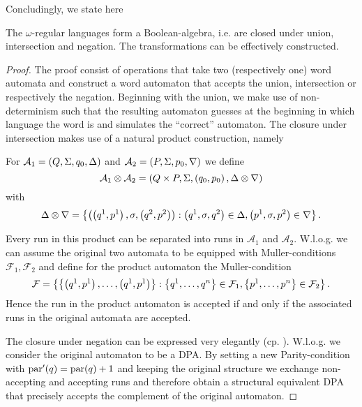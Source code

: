 Concludingly, we state here
\begin{theorem}
  \cite[Consequence from Theorem 1.5 and Theorem 1.24]{AutoLogAndInfGames}
  The $\omega$-regular languages form a Boolean-algebra, i.e. are closed under
  union, intersection and negation. The transformations can be effectively
  constructed.
  \label{thm:omegaregboolean}
\end{theorem}
\begin{proof}
  The proof consist of operations that take two (respectively one) word 
  automata and construct a word automaton that accepts the union, intersection 
  or respectively the negation. Beginning with the union, we make use of
  non-determinism such that the resulting automaton guesses at the beginning in
  which language the word is and simulates the \enquote{correct} automaton. The 
  closure under intersection makes use of a natural product construction, 
  namely
  \begin{definition}
    For $\mathcal{A}_{1} = \left(Q, \Sigma, q_{0}, \Delta\right)$ and
    $\mathcal{A}_{2} = \left(P, \Sigma, p_{0}, \nabla\right)$ we define
    \begin{equation*}
      \mathcal{A}_{1}\otimes\mathcal{A}_{2} = \left(Q\times P, \Sigma, 
      \left(q_{0}, p_{0}\right), \Delta\otimes\nabla\right)
    \end{equation*}
    with
    \begin{equation*}
      \Delta\otimes\nabla = 
      \left\{\left(\left(q^{1}, p^{1}\right), \sigma, 
      \left(q^{2}, p^{2}\right)\right): \left(q^{1},\sigma, q^{2}\right)\in\Delta, 
      \left(p^{1},\sigma, p^{2}\right)\in\nabla\right\}.
    \end{equation*}
  \end{definition}
  Every run in this product can be separated into runs in $\mathcal{A}_{1}$ and
  $\mathcal{A}_{2}$. W.l.o.g. we can assume the original two automata to be
  equipped with Muller-conditions $\mathcal{F}_{1},\mathcal{F}_{2}$ and define
  for the product automaton the Muller-condition 
  \begin{equation*}
    \mathcal{F} = \left\{\left\{\left(q^{1}, p^{1}\right),\dots,\left(q^{1}, p^{1}\right)\right\}:
    \left\{q^{1},\dots,q^{n}\right\}\in\mathcal{F}_{1},
    \left\{p^{1},\dots,p^{n}\right\}\in\mathcal{F}_{2}\right\}.
  \end{equation*}
  Hence the run in the product automaton is accepted if and only if the 
  associated runs in the original automata are accepted.

  The closure under negation can be expressed very elegantly (cp. 
  \cite[Transformation 1.25.]{AutoLogInfGames}). W.l.o.g. we consider the 
  original automaton to be a \ac{DPA}. By setting a new Parity-condition with
  $\operatorname{par}'(q) = \operatorname{par}(q) + 1$ and keeping the original structure we exchange
  non-accepting and accepting runs and therefore obtain a structural equivalent 
  \ac{DPA} that precisely accepts the complement of the original automaton.
\end{proof}

